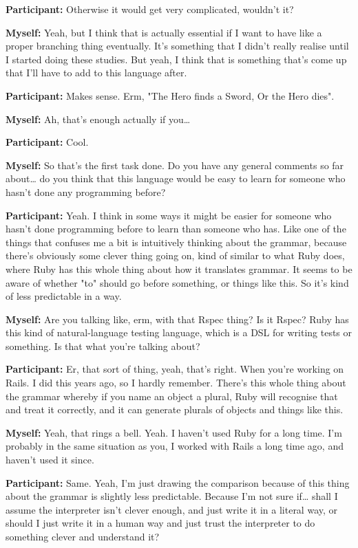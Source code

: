 \documentclass[11pt]{report}
\newcommand{\llabel}[1]{\hypertarget{llineno:#1}{\linelabel{#1}}}
\begin{document}
\begin{linenumbers}
\textbf{Participant:} Otherwise it would get very complicated, wouldn't it?

\textbf{Myself:} Yeah, but I think that is actually essential if I want to have like a proper branching thing eventually. It's something that I didn't really realise until I started doing these studies. But yeah, I think that is something that's come up that I'll have to add to this language after.

\textbf{Participant:} Makes sense. Erm, "The Hero finds a Sword, Or the Hero dies".

\textbf{Myself:} Ah, that's enough actually if you\ldots{}

\textbf{Participant:} Cool.

\textbf{Myself:} So that's the first task done. Do you have any general comments so far about\ldots{} do you think that this language would be easy to learn for someone who hasn't done any programming before?

\textbf{Participant:} Yeah. I think in some ways it might be easier for someone
who hasn't done programming before to learn than someone who has. Like one of
the things that confuses me a bit is intuitively thinking about the grammar,
because there's obviously some clever thing going on, kind of similar to what
Ruby does, where Ruby has this whole thing about how it translates grammar. It
seems to be aware of whether "to" should go before something, or things like
this. So it's kind of less predictable in a way.\llabel{lne:use1d}

\textbf{Myself:} Are you talking like, erm, with that Rspec thing? Is it Rspec? Ruby has this kind of natural-language testing language, which is a DSL for writing tests or something. Is that what you're talking about?

\textbf{Participant:} Er, that sort of thing, yeah, that's right. When you're working on Rails. I did this years ago, so I hardly remember. There's this whole thing about the grammar whereby if you name an object a plural, Ruby will recognise that and treat it correctly, and it can generate plurals of objects and things like this.

\textbf{Myself:} Yeah, that rings a bell. Yeah. I haven't used Ruby for a long time. I'm probably in the same situation as you, I worked with Rails a long time ago, and haven't used it since.

\textbf{Participant:} Same. Yeah, I'm just drawing the comparison because of
this thing about the grammar is slightly less predictable. Because I'm not sure
if\ldots{} shall I assume the interpreter isn't clever enough, and just write it
in a literal way, or should I just write it in a human way and just trust the
interpreter to do something clever and understand it?\llabel{lne:syntax1d2}


\end{linenumbers}
\end{document}
